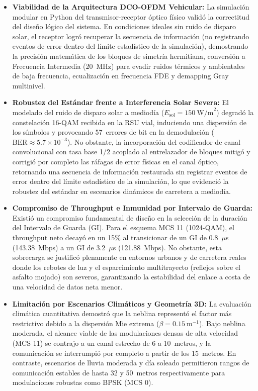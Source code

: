 \begin{itemize}
    \item \textbf{Viabilidad de la Arquitectura DCO-OFDM Vehicular:}
    La simulación modular en Python del transmisor-receptor óptico físico validó la correctitud del diseño lógico del sistema. En condiciones ideales sin ruido de disparo solar, el receptor logró recuperar la secuencia de información (no registrando eventos de error dentro del límite estadístico de la simulación), demostrando la precisión matemática de los bloques de simetría hermitiana, conversión a Frecuencia Intermedia (20~MHz) para evadir ruidos térmicos y ambientales de baja frecuencia, ecualización en frecuencia FDE y demapping Gray multinivel.
    
    \item \textbf{Robustez del Estándar frente a Interferencia Solar Severa:}
    El modelado del ruido de disparo solar a mediodía ($E_{\text{sol}} = 150~\text{W/m}^2$) degradó la constelación 16-QAM recibida en la RSU vial, induciendo una dispersión de los símbolos y provocando 57~errores de bit en la demodulación ($\text{BER} \approx 5.7 \times 10^{-3}$). No obstante, la incorporación del codificador de canal convolucional con tasa base 1/2 acoplado al entrelazador de bloques mitigó y corrigió por completo las ráfagas de error físicas en el canal óptico, retornando una secuencia de información restaurada sin registrar eventos de error dentro del límite estadístico de la simulación, lo que evidenció la robustez del estándar en escenarios dinámicos de carretera a mediodía.
    
    \item \textbf{Compromiso de Throughput e Inmunidad por Intervalo de Guarda:}
    Existió un compromiso fundamental de diseño en la selección de la duración del Intervalo de Guarda (GI). Para el esquema MCS 11 (1024-QAM), el throughput neto decayó en un 15\% al transicionar de un GI de 0.8~$\mu$s (143.38~Mbps) a un GI de 3.2~$\mu$s (121.88~Mbps). No obstante, esta sobrecarga se justificó plenamente en entornos urbanos y de carretera reales donde los rebotes de luz y el esparcimiento multitrayecto (reflejos sobre el asfalto mojado) son severos, garantizando la estabilidad del enlace a costa de una velocidad de datos neta menor.
    
    \item \textbf{Limitación por Escenarios Climáticos y Geometría 3D:}
    La evaluación climática cuantitativa demostró que la neblina representó el factor más restrictivo debido a la dispersión Mie extrema ($\beta = 0.15~\text{m}^{-1}$). Bajo neblina moderada, el alcance viable de las modulaciones densas de alta velocidad (MCS 11) se contrajo a un canal estrecho de 6 a 10~metros, y la comunicación se interrumpió por completo a partir de los 15~metros. En contraste, escenarios de lluvia moderada y día soleado permitieron rangos de comunicación estables de hasta 32 y 50~metros respectivamente para modulaciones robustas como BPSK (MCS 0).
\end{itemize}

